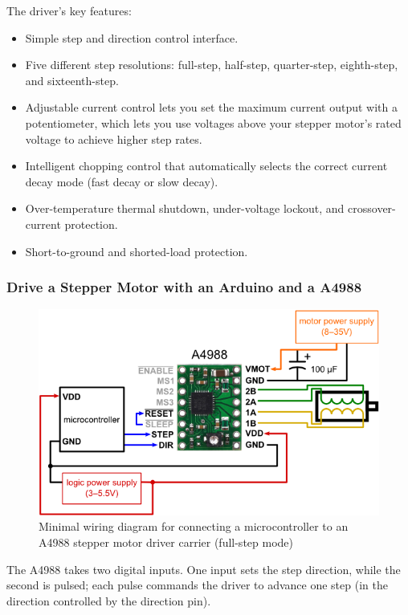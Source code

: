 The driver's key features:
\begin{itemize}
\item Simple step and direction control interface.
\item Five different step resolutions: full-step, half-step, quarter-step, eighth-step, and sixteenth-step.
\item Adjustable current control lets you set the maximum current output with a potentiometer, which lets you use voltages above your stepper motor's rated voltage to achieve higher step rates.
\item Intelligent chopping control that automatically selects the correct current decay mode (fast decay or slow decay).
\item Over-temperature thermal shutdown, under-voltage lockout, and crossover-current protection.
\item Short-to-ground and shorted-load protection.
\end{itemize}

\subsubsection{Drive a Stepper Motor with an Arduino and a A4988}
\begin{figure}[H]
	\centering
	\includegraphics[width=\maxwidth{8cm}, keepaspectratio]{Chapters/Fig/minimal_wiring_diagram_pololu_A4988.png}
	\caption{Minimal wiring diagram for connecting a microcontroller to an A4988 stepper motor driver carrier (full-step mode)}
	\label{fig:minimal_wiring_diagram_pololu_A4988}
\end{figure}
The A4988 takes two digital inputs. One input sets the step direction, while the second is pulsed; each pulse commands the driver to advance one step (in the direction controlled by the direction pin). 

